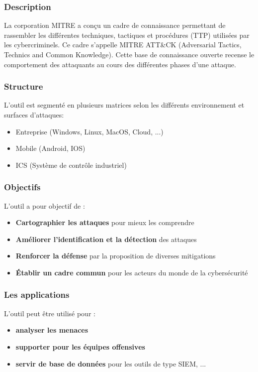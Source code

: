 \documentclass[12pt,letterpaper]{article}
\begin{document}
\subsubsection{Description}

La corporation MITRE a conçu un cadre de connaissance permettant de rassembler les différentes techniques, tactiques et procédures (TTP) utilisées par les cybercriminels. Ce cadre s'appelle MITRE ATT\&CK (Adversarial Tactics, Technics and Common Knowledge). Cette base de connaissance ouverte recense le comportement des attaquants au cours des différentes phases d'une attaque. 

\subsubsection{Structure}

L'outil est segmenté en plusieurs matrices selon les différents environnement et surfaces d'attaques:
\begin{itemize}
    \item Entreprise (Windows, Linux, MacOS, Cloud, ...)
    \item Mobile (Android, IOS)
    \item ICS (Système de contrôle industriel)
\end{itemize}

\subsubsection{Objectifs}

L'outil a pour objectif de :
\begin{itemize}
    \item \textbf{Cartographier les attaques} pour mieux les comprendre
    \item \textbf{Améliorer l'identification et la détection} des attaques
    \item \textbf{Renforcer la défense} par la proposition de diverses mitigations
    \item \textbf{Établir un cadre commun} pour les acteurs du monde de la cybersécurité
\end{itemize}

\subsubsection{Les applications}

L'outil peut être utilisé pour :
\begin{itemize}
    \item \textbf{analyser les menaces}
    \item \textbf{supporter pour les équipes offensives}
    \item \textbf{servir de base de données} pour les outils de type SIEM, ...
\end{itemize}
\end{document}
